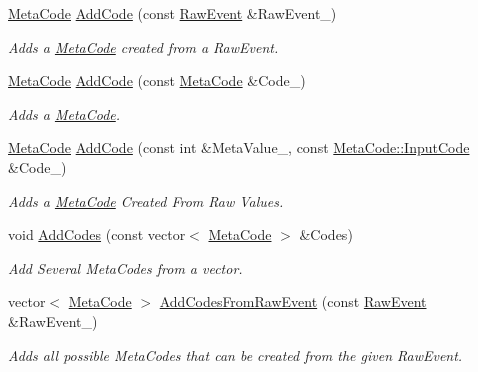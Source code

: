 \begin{DoxyCompactItemize}
\hyperlink{classphys_1_1MetaCode}{MetaCode} \hyperlink{classphys_1_1EventUserInput_a1dd4a5a8021fd0e36fa394d0132e8f2c}{AddCode} (const \hyperlink{namespacephys_a8126d26e4507e66d09876988bb941fd4}{RawEvent} \&RawEvent\_\-)
\begin{DoxyCompactList}\small\item\em Adds a \hyperlink{classphys_1_1MetaCode}{MetaCode} created from a RawEvent. \item\end{DoxyCompactList}\item 
\hyperlink{classphys_1_1MetaCode}{MetaCode} \hyperlink{classphys_1_1EventUserInput_aa244b6b8a4b7dc930e25ef8b24af84f4}{AddCode} (const \hyperlink{classphys_1_1MetaCode}{MetaCode} \&Code\_\-)
\begin{DoxyCompactList}\small\item\em Adds a \hyperlink{classphys_1_1MetaCode}{MetaCode}. \item\end{DoxyCompactList}\item 
\hyperlink{classphys_1_1MetaCode}{MetaCode} \hyperlink{classphys_1_1EventUserInput_a9f87a9e6b57f8958945d4955922ebacd}{AddCode} (const int \&MetaValue\_\-, const \hyperlink{classphys_1_1MetaCode_a3e501cbb5bf0f6f1fdb7211465bda8d8}{MetaCode::InputCode} \&Code\_\-)
\begin{DoxyCompactList}\small\item\em Adds a \hyperlink{classphys_1_1MetaCode}{MetaCode} Created From Raw Values. \item\end{DoxyCompactList}\item 
void \hyperlink{classphys_1_1EventUserInput_a1da1fcba3c00346e00c1d4477cc3dbe9}{AddCodes} (const vector$<$ \hyperlink{classphys_1_1MetaCode}{MetaCode} $>$ \&Codes)
\begin{DoxyCompactList}\small\item\em Add Several MetaCodes from a vector. \item\end{DoxyCompactList}\item 
vector$<$ \hyperlink{classphys_1_1MetaCode}{MetaCode} $>$ \hyperlink{classphys_1_1EventUserInput_aa83cb95f719dbdceae282f0dc545aeb0}{AddCodesFromRawEvent} (const \hyperlink{namespacephys_a8126d26e4507e66d09876988bb941fd4}{RawEvent} \&RawEvent\_\-)
\begin{DoxyCompactList}\small\item\em Adds all possible MetaCodes that can be created from the given RawEvent. \item\end{DoxyCompactList}\item 

\end{DoxyCompactItemize}
